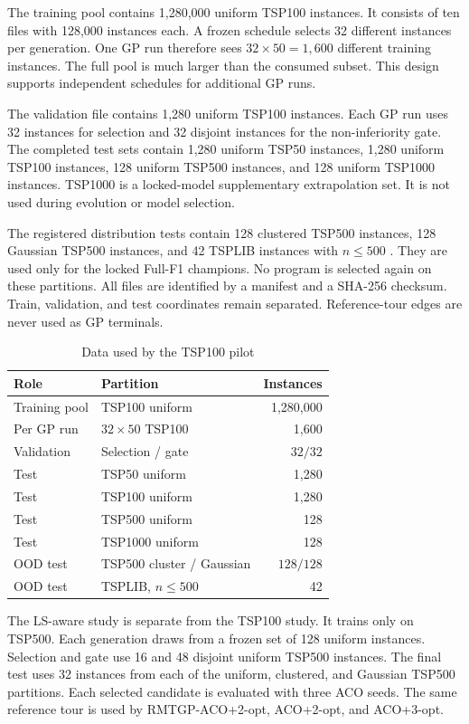 \documentclass[letterpaper,journal]{IEEEtran}
\begin{document}
The training pool contains 1,280,000 uniform TSP100 instances.
It consists of ten files with 128,000 instances each.
A frozen schedule selects 32 different instances per generation.
One GP run therefore sees \(32\times50=1,600\) different training instances.
The full pool is much larger than the consumed subset.
This design supports independent schedules for additional GP runs.

The validation file contains 1,280 uniform TSP100 instances.
Each GP run uses 32 instances for selection and 32 disjoint instances for the non-inferiority gate.
The completed test sets contain 1,280 uniform TSP50 instances, 1,280 uniform TSP100 instances, 128 uniform TSP500 instances, and 128 uniform TSP1000 instances.
TSP1000 is a locked-model supplementary extrapolation set.
It is not used during evolution or model selection.

The registered distribution tests contain 128 clustered TSP500 instances, 128 Gaussian TSP500 instances, and 42 TSPLIB instances with \(n\leq500\) \cite{reinelt1991tsplib}.
They are used only for the locked Full-F1 champions.
No program is selected again on these partitions.
All files are identified by a manifest and a SHA-256 checksum.
Train, validation, and test coordinates remain separated.
Reference-tour edges are never used as GP terminals.

\begin{table}[t]
\caption{Data used by the TSP100 pilot}
\label{tab:data}
\centering
\footnotesize
\begin{tabular}{llr}
\toprule
Role & Partition & Instances\\
\midrule
Training pool & TSP100 uniform & 1,280,000\\
Per GP run & \(32\times50\) TSP100 & 1,600\\
Validation & Selection / gate & \(32/32\)\\
Test & TSP50 uniform & 1,280\\
Test & TSP100 uniform & 1,280\\
Test & TSP500 uniform & 128\\
Test & TSP1000 uniform & 128\\
OOD test & TSP500 cluster / Gaussian & \(128/128\)\\
OOD test & TSPLIB, \(n\leq500\) & 42\\
\bottomrule
\end{tabular}
\end{table}

The LS-aware study is separate from the TSP100 study.
It trains only on TSP500.
Each generation draws from a frozen set of 128 uniform instances.
Selection and gate use 16 and 48 disjoint uniform TSP500 instances.
The final test uses 32 instances from each of the uniform, clustered, and
Gaussian TSP500 partitions.
Each selected candidate is evaluated with three ACO seeds.
The same reference tour is used by RMTGP-ACO+2-opt, ACO+2-opt, and ACO+3-opt.
\end{document}
